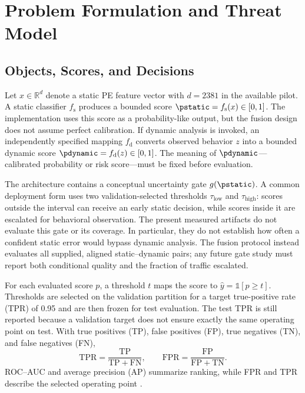 \section{Problem Formulation and Threat Model}
\label{sec:problem}

\subsection{Objects, Scores, and Decisions}

Let $x\in\mathbb{R}^{d}$ denote a static PE feature vector with $d=2381$ in the
available pilot. A static classifier $f_{\mathrm{s}}$ produces a bounded score
$\pstatic=f_{\mathrm{s}}(x)\in[0,1]$. The implementation uses this score as a
probability-like output, but the fusion design does not assume perfect
calibration. If dynamic analysis is invoked, an independently specified mapping
$f_{\mathrm{d}}$ converts observed behavior $z$ into a bounded dynamic score
$\pdynamic=f_{\mathrm{d}}(z)\in[0,1]$. The meaning of $\pdynamic$---calibrated
probability or risk score---must be fixed before evaluation.

The architecture contains a conceptual uncertainty gate $g(\pstatic)$. A common
deployment form uses two validation-selected thresholds $\tau_{\mathrm{low}}$ and
$\tau_{\mathrm{high}}$: scores outside the interval can receive an early static
decision, while scores inside it are escalated for behavioral observation. The
present measured artifacts do not evaluate this gate or its coverage. In
particular, they do not establish how often a confident static error would bypass
dynamic analysis. The fusion protocol instead evaluates all supplied, aligned
static--dynamic pairs; any future gate study must report both conditional quality
and the fraction of traffic escalated.

For each evaluated score $p$, a threshold $t$ maps the score to
$\widehat{y}=\mathbb{1}[p\geq t]$. Thresholds are selected on the validation
partition for a target true-positive rate (TPR) of 0.95 and are then frozen for
test evaluation. The test TPR is still reported because a validation target does
not ensure exactly the same operating point on test. With true positives (TP),
false positives (FP), true negatives (TN), and false negatives (FN),
\begin{equation}
\mathrm{TPR}=\frac{\mathrm{TP}}{\mathrm{TP}+\mathrm{FN}},\qquad
\mathrm{FPR}=\frac{\mathrm{FP}}{\mathrm{FP}+\mathrm{TN}}.
\label{eq:tpr-fpr}
\end{equation}
ROC--AUC and average precision (AP) summarize ranking, while FPR and TPR describe
the selected operating point \cite{fawcett2006roc,saito2015precision}.

